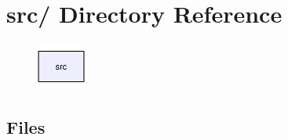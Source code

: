 \hypertarget{dir_000000}{
\section{src/ Directory Reference}
\label{dir_000000}
}


\begin{figure}[H]
\begin{center}
\leavevmode
\includegraphics[width=45pt]{dir_000000_dep}
\end{center}
\end{figure}
\subsection*{Files}
